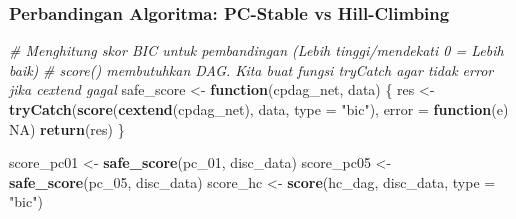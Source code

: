 \documentclass[
  11pt,
]{article}
\newenvironment{Shaded}{\begin{snugshade}}{\end{snugshade}}
\newcommand{\AttributeTok}[1]{\textcolor[rgb]{0.13,0.29,0.53}{#1}}
\newcommand{\CommentTok}[1]{\textcolor[rgb]{0.56,0.35,0.01}{\textit{#1}}}
\newcommand{\ConstantTok}[1]{\textcolor[rgb]{0.56,0.35,0.01}{#1}}
\newcommand{\ControlFlowTok}[1]{\textcolor[rgb]{0.13,0.29,0.53}{\textbf{#1}}}
\newcommand{\FunctionTok}[1]{\textcolor[rgb]{0.13,0.29,0.53}{\textbf{#1}}}
\newcommand{\NormalTok}[1]{#1}
\newcommand{\OtherTok}[1]{\textcolor[rgb]{0.56,0.35,0.01}{#1}}
\newcommand{\StringTok}[1]{\textcolor[rgb]{0.31,0.60,0.02}{#1}}
\begin{document}
\subsubsection{Perbandingan Algoritma: PC-Stable vs
Hill-Climbing}\label{perbandingan-algoritma-pc-stable-vs-hill-climbing}

\begin{Shaded}
\begin{Highlighting}[]
\CommentTok{\# Menghitung skor BIC untuk pembandingan (Lebih tinggi/mendekati 0 = Lebih baik)}
\CommentTok{\# score() membutuhkan DAG. Kita buat fungsi tryCatch agar tidak error jika cextend gagal}
\NormalTok{safe\_score }\OtherTok{\textless{}{-}} \ControlFlowTok{function}\NormalTok{(cpdag\_net, data) \{}
\NormalTok{  res }\OtherTok{\textless{}{-}} \FunctionTok{tryCatch}\NormalTok{(}\FunctionTok{score}\NormalTok{(}\FunctionTok{cextend}\NormalTok{(cpdag\_net), data, }\AttributeTok{type =} \StringTok{"bic"}\NormalTok{), }\AttributeTok{error =} \ControlFlowTok{function}\NormalTok{(e) }\ConstantTok{NA}\NormalTok{)}
  \FunctionTok{return}\NormalTok{(res)}
\NormalTok{\}}

\NormalTok{score\_pc01 }\OtherTok{\textless{}{-}} \FunctionTok{safe\_score}\NormalTok{(pc\_01, disc\_data)}
\NormalTok{score\_pc05 }\OtherTok{\textless{}{-}} \FunctionTok{safe\_score}\NormalTok{(pc\_05, disc\_data)}
\NormalTok{score\_hc   }\OtherTok{\textless{}{-}} \FunctionTok{score}\NormalTok{(hc\_dag, disc\_data, }\AttributeTok{type =} \StringTok{"bic"}\NormalTok{)}


\end{Highlighting}
\end{Shaded}
\end{document}
